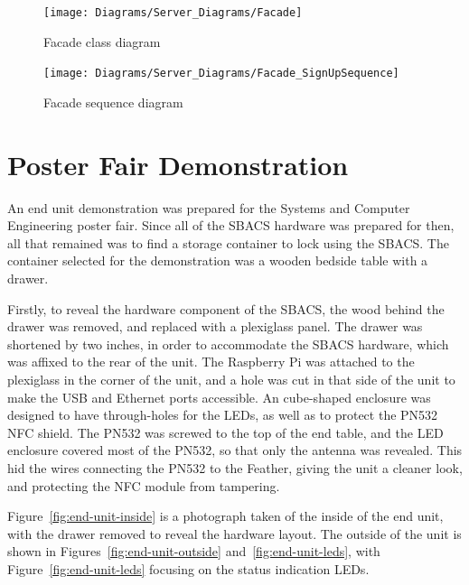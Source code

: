\documentclass[12pt]{report}
\let\Oldsection\section
\renewcommand{\section}{\FloatBarrier\Oldsection}
\begin{document}
\begin{figure}
    \texttt{[image: Diagrams/Server\_Diagrams/Facade]}
    \caption{Facade class diagram}
    \label{fig:facade-server}
\end{figure}

\begin{figure}
    \texttt{[image: Diagrams/Server\_Diagrams/Facade\_SignUpSequence]}
    \caption{Facade sequence diagram}
    \label{fig:facade-signup}
\end{figure}




\section{Poster Fair Demonstration} \label{poster-fair-demonstration}


An end unit demonstration was prepared for the Systems and Computer Engineering poster fair. Since all of the SBACS 
hardware was prepared for then, all that remained was to find a storage container to lock using the SBACS. The 
container selected for the demonstration was a wooden bedside table with a drawer.


Firstly, to reveal the hardware component of the SBACS, the wood behind the drawer was removed, and replaced with a 
plexiglass panel. The drawer was shortened by two inches, in order to accommodate the SBACS hardware, which was affixed 
to the rear of the unit. The Raspberry Pi was attached to the plexiglass in the corner of the unit, and a hole was cut 
in that side of the unit to make the USB and Ethernet ports accessible. An cube-shaped enclosure was designed to have 
through-holes for the LEDs, as well as to protect the PN532 NFC shield. The PN532 was screwed to the top of the end 
table, and the LED enclosure covered most of the PN532, so that only the antenna was revealed. This hid the wires 
connecting the PN532 to the Feather, giving the unit a cleaner look, and protecting the NFC module from tampering.

Figure~\ref{fig:end-unit-inside} is a photograph taken of the inside of the end unit, with the drawer removed to reveal 
the hardware layout. The outside of the unit is shown in Figures~\ref{fig:end-unit-outside} 
and~\ref{fig:end-unit-leds}, with Figure~\ref{fig:end-unit-leds} focusing on the status indication LEDs.
\end{document}

